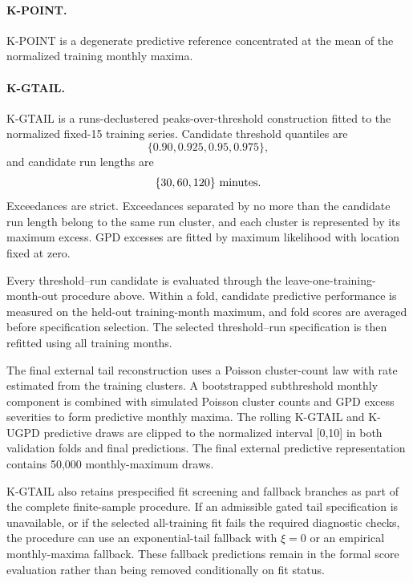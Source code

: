 \documentclass[]{interact}
\begin{document}
\paragraph*{K-POINT.}

K-POINT is a degenerate predictive reference concentrated at the mean
of the normalized training monthly maxima.

\paragraph*{K-GTAIL.}

K-GTAIL is a runs-declustered peaks-over-threshold construction fitted
to the normalized fixed-15 training series. Candidate threshold
quantiles are
\[
\{0.90,0.925,0.95,0.975\},
\]
and candidate run lengths are
\[
\{30,60,120\}\ {\rm minutes}.
\]
Exceedances are strict. Exceedances separated by no more than the
candidate run length belong to the same run cluster, and each cluster
is represented by its maximum excess. GPD excesses are fitted by
maximum likelihood with location fixed at zero.

Every threshold--run candidate is evaluated through the
leave-one-training-month-out procedure above. Within a fold, candidate
predictive performance is measured on the held-out training-month
maximum, and fold scores are averaged before specification selection.
The selected threshold--run specification is then refitted using all
training months.

The final external tail reconstruction uses a Poisson cluster-count
law with rate estimated from the training clusters. A bootstrapped
subthreshold monthly component is combined with simulated Poisson
cluster counts and GPD excess severities to form predictive monthly
maxima. The rolling K-GTAIL and K-UGPD predictive draws are clipped
to the normalized interval [0,10] in both validation folds and final
predictions. The final external predictive representation contains
50,000 monthly-maximum draws.

K-GTAIL also retains prespecified fit screening and fallback branches
as part of the complete finite-sample procedure. If an admissible
gated tail specification is unavailable, or if the selected
all-training fit fails the required diagnostic checks, the procedure
can use an exponential-tail fallback with \(\xi=0\) or an empirical
monthly-maxima fallback. These fallback predictions remain in the
formal score evaluation rather than being removed conditionally on fit
status.
\end{document}
